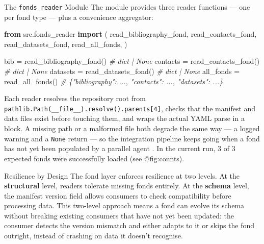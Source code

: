 \documentclass[
  ignorenonframetext,
]{beamer}
\newenvironment{Shaded}{}{}
\newcommand{\CommentTok}[1]{\textcolor[rgb]{0.38,0.63,0.69}{\textit{#1}}}
\newcommand{\ImportTok}[1]{\textcolor[rgb]{0.00,0.50,0.00}{\textbf{#1}}}
\newcommand{\NormalTok}[1]{#1}
\newcommand{\OperatorTok}[1]{\textcolor[rgb]{0.40,0.40,0.40}{#1}}
\begin{document}
\begin{frame}{The \texttt{fonds\_reader}
Module}
\protect{}\label{the-fonds_reader-module}
The  module provides three reader functions
--- one per fond type --- plus a convenience aggregator:

\begin{Shaded}
\begin{Highlighting}[]
\ImportTok{from}\NormalTok{ src.fonds\_reader }\ImportTok{import}\NormalTok{ (}
\NormalTok{    read\_bibliography\_fond,}
\NormalTok{    read\_contacts\_fond,}
\NormalTok{    read\_datasets\_fond,}
\NormalTok{    read\_all\_fonds,}
\NormalTok{)}

\NormalTok{bib      }\OperatorTok{=}\NormalTok{ read\_bibliography\_fond()   }\CommentTok{\# dict | None}
\NormalTok{contacts }\OperatorTok{=}\NormalTok{ read\_contacts\_fond()       }\CommentTok{\# dict | None}
\NormalTok{datasets }\OperatorTok{=}\NormalTok{ read\_datasets\_fond()       }\CommentTok{\# dict | None}
\NormalTok{all\_fonds }\OperatorTok{=}\NormalTok{ read\_all\_fonds()          }\CommentTok{\# \{"bibliography": ..., "contacts": ..., "datasets": ...\}}
\end{Highlighting}
\end{Shaded}

Each reader resolves the repository root from
\texttt{pathlib.Path(\_\_file\_\_).resolve().parents{[}4{]}}, checks
that the manifest and data files exist before touching them, and wraps
the actual YAML parse in a
block. A missing path or a malformed file both degrade the same way ---
a logged warning and a \texttt{None} return --- so the integration
pipeline keeps going when a fond has not yet been populated by a
parallel agent . In the current run, 3 of 3
expected fonds were successfully loaded (see @fig:counts).
\end{frame}

\begin{frame}[allowframebreaks]{Resilience by Design}
\protect{}\label{resilience-by-design}
The fond layer enforces resilience at two levels. At the
\textbf{structural} level, readers tolerate missing fonds entirely. At
the \textbf{schema} level, the manifest version field allows consumers
to check compatibility before processing data. This two-level approach
means a fond can evolve its schema without breaking existing consumers
that have not yet been updated: the consumer detects the version
mismatch and either adapts to it or skips the fond outright, instead of
crashing on data it doesn't recognise.
\end{frame}
\end{document}
